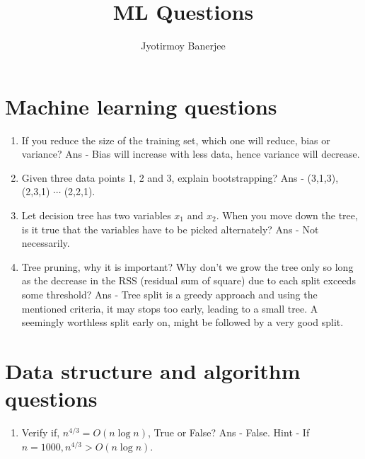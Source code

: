\documentclass{article}
\title{ML Questions}
\author{Jyotirmoy Banerjee}
\begin{document}
\maketitle

\section{Machine learning questions}

\begin{enumerate}
\item If you reduce the size of the training set, which one will reduce, bias or variance? Ans - Bias will increase with less data, hence variance will decrease.
\item Given three data points 1, 2 and 3, explain bootstrapping? Ans - (3,1,3), (2,3,1) $\cdots$ (2,2,1).
\item Let decision tree has two variables $x_1$ and $x_2$. When you move down the tree, is it true that the variables have to be picked alternately? Ans - Not necessarily. 
\item Tree pruning, why it is important? Why don't we grow the tree only so long as the decrease in the RSS (residual sum of square) due to each split exceeds some threshold? Ans - Tree split is a greedy approach and using the mentioned criteria, it may stops too early, leading to a small tree. A seemingly worthless split early on, might be followed by a very good split.
\end{enumerate}

\section{Data structure and algorithm questions}

\begin{enumerate}
\item Verify if, $n^{4/3} = O(n \log n)$, True or False? Ans - False. Hint - If $n = 1000, n^{4/3} > O(n \log n)$.
\end{enumerate}
\end{document}
